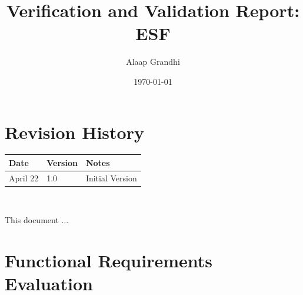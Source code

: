 \documentclass[12pt, titlepage]{article}
\begin{document}
\title{Verification and Validation Report: ESF} 
\author{Alaap Grandhi}
\date{\today}
	
\maketitle


\section{Revision History}

\begin{tabularx}{\textwidth}{p{3cm}p{2cm}X}
\toprule {\bf Date} & {\bf Version} & {\bf Notes}\\
\midrule
April 22 & 1.0 & Initial Version\\
\bottomrule
\end{tabularx}

~\newpage




\newpage

\tableofcontents



\newpage


This document ...

\section{Functional Requirements Evaluation}
\end{document}
